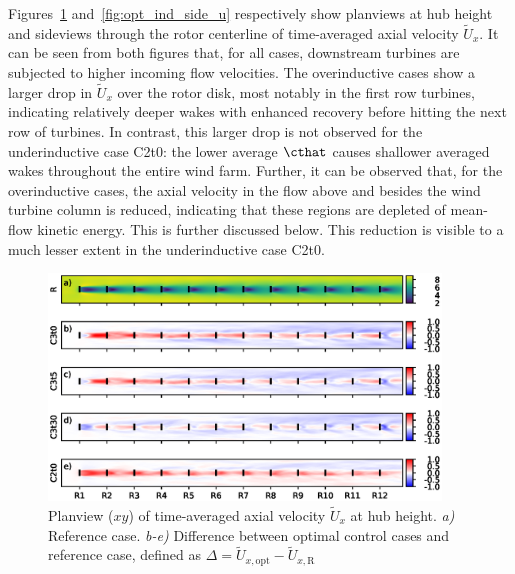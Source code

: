	Figures~\ref{fig:opt_ind_top_u} and~\ref{fig:opt_ind_side_u} respectively show planviews at hub height and sideviews through the rotor
	centerline of time-averaged axial velocity ${\widetilde{U}}_x$. It can be seen from both figures that, for all cases, downstream
	turbines are subjected to higher incoming flow velocities. The overinductive cases show a larger drop in $\widetilde{U}_x$ over the
	rotor disk, most notably in the first row turbines, indicating relatively deeper wakes with enhanced recovery before hitting the next row of
	turbines. In contrast, this larger drop is not observed for the underinductive case C2t0: the lower average $\cthat$ causes shallower averaged
	wakes throughout the entire wind farm. Further, it can be observed that, for the overinductive cases, the axial velocity in the flow above and
	besides the wind turbine column is reduced, indicating that these regions are depleted of mean-flow kinetic energy. This is further discussed
	below. This reduction is visible to a much lesser extent in the underinductive case C2t0.
	
	\begin{figure}[ht]
		\centering
		\includegraphics[width=0.93\textwidth]{chapters/optimal_induction_control/topview_u.eps}
		\caption{Planview ($xy$) of time-averaged axial velocity $\widetilde{U}_x$ at hub height. \emph{a) } Reference case. \emph{b-e)} Difference between optimal control cases and reference case, defined as $\Delta = \widetilde{U}_{x,\text{opt}} - \widetilde{U}_{x,\text{R}}$  \label{fig:opt_ind_top_u}}
	\end{figure}

